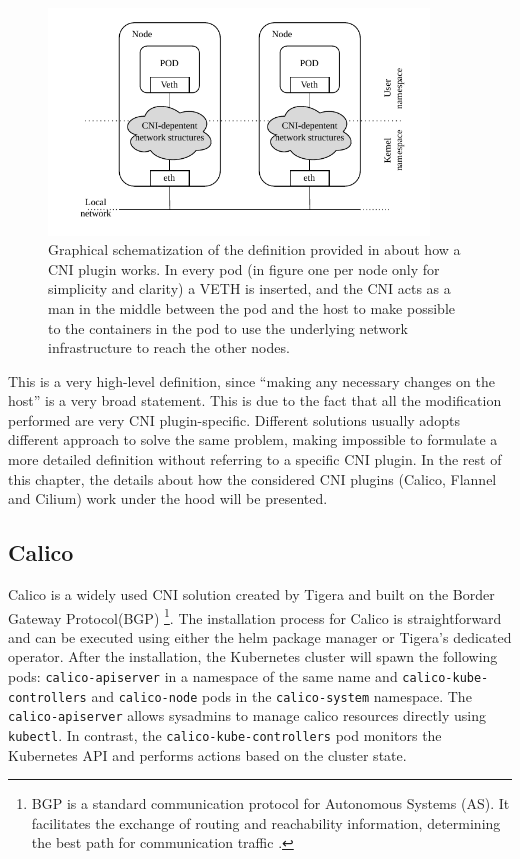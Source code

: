 \begin{figure}[H]
  \centering
  \includegraphics[width=0.9\textwidth]{img/chpt2/CNI-generic}
  \caption{Graphical schematization of the definition provided in
    \cite{redhat-cni} about how a CNI plugin works. In every pod (in figure one
    per node only for simplicity and clarity) a VETH is inserted, and the CNI
    acts as a man in the middle between the pod and the host to make possible to
    the containers in the pod to use the underlying network infrastructure to
    reach the other nodes.}
  \label{fig:cni-generic}
\end{figure}


This is a very high-level definition, since ``making any necessary changes on
the host'' is a very broad statement. This is due to the fact that all the
modification performed are very CNI plugin-specific. Different solutions usually
adopts different approach to solve the same problem, making impossible to
formulate a more detailed definition without referring to a specific CNI plugin.
In the rest of this chapter, the details about how the considered CNI plugins
(Calico, Flannel and Cilium) work under the hood will be presented.


\subsection{Calico}\label{subsec:calico}

Calico is a widely used CNI solution created by Tigera and built on the Border
Gateway Protocol(BGP) \footnote{BGP is a standard communication protocol for
Autonomous Systems (AS). It facilitates the exchange of routing and reachability
information, determining the best path for communication traffic
\cite{BGPnistdef}.}. The installation process for Calico is straightforward and
can be executed using either the helm package manager or Tigera's dedicated
operator. After the installation, the Kubernetes cluster will spawn the
following pods: \texttt{calico-apiserver} in a namespace of the same name and
\texttt{calico-kube-controllers} and \texttt{calico-node} pods in the
\texttt{calico-system} namespace. The \texttt{calico-apiserver} allows sysadmins
to manage calico resources directly using \texttt{kubectl}. In contrast, the
\texttt{calico-kube-controllers} pod monitors the Kubernetes API and performs
actions based on the cluster state.

